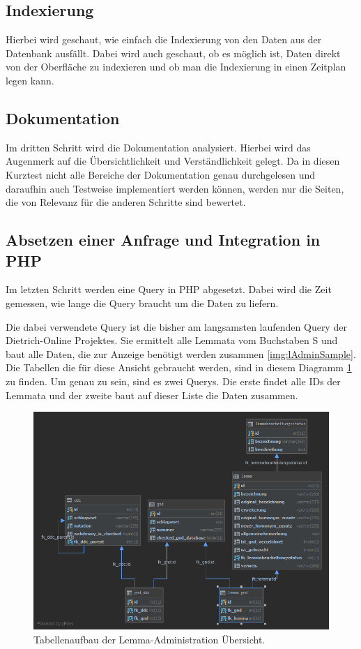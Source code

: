 \subsection{Indexierung}

Hierbei wird geschaut, wie einfach die Indexierung von den Daten aus der Datenbank ausfällt. Dabei wird auch geschaut, ob es möglich ist, Daten direkt von der Oberfläche zu indexieren und ob man die Indexierung in einen Zeitplan legen kann.

\subsection{Dokumentation}

Im dritten Schritt wird die Dokumentation analysiert. Hierbei wird das Augenmerk auf die Übersichtlichkeit und Verständlichkeit gelegt. Da in diesen Kurztest nicht alle Bereiche der Dokumentation genau durchgelesen und daraufhin auch Testweise implementiert werden können, werden nur die Seiten, die von Relevanz für die anderen Schritte sind bewertet.

\subsection{Absetzen einer Anfrage und Integration in PHP}

Im letzten Schritt werden eine Query in PHP abgesetzt. Dabei wird die Zeit gemessen, wie lange die Query braucht um die Daten zu liefern.

Die dabei verwendete Query ist die bisher am langsamsten laufenden Query der Dietrich-Online Projektes. Sie ermittelt alle Lemmata vom Buchstaben S und baut alle Daten, die zur Anzeige benötigt werden zusammen \ref{img:lAdminSample}. Die Tabellen die für diese Ansicht gebraucht werden, sind in diesem Diagramm \ref{img:lAdminStructure} zu finden. Um genau zu sein, sind es zwei Querys. Die erste findet alle IDs der Lemmata und der zweite baut auf dieser Liste die Daten zusammen.

\begin{figure}
	\centering
	\includegraphics[width=0.8\linewidth]{images/structure_lemmaadministration.png}
	\caption{Tabellenaufbau der Lemma-Administration Übersicht.}
	\label{img:lAdminStructure}
\end{figure}

